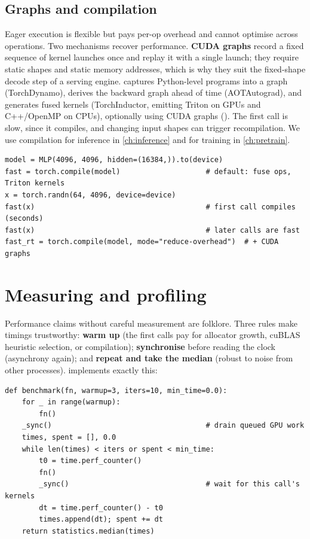 \subsection{Graphs and compilation}
Eager execution is flexible but pays per-op overhead and cannot optimise across operations. Two mechanisms
recover performance. \textbf{CUDA graphs} record a fixed sequence of kernel launches once and replay it with a
single launch; they require static shapes and static memory addresses, which is why they suit the
fixed-shape decode step of a serving engine. \textbf{} captures Python-level programs into a
graph (TorchDynamo), derives the backward graph ahead of time (AOTAutograd), and generates fused kernels
(TorchInductor, emitting Triton on GPUs and C++/OpenMP on CPUs), optionally using CUDA graphs
(). The first call is slow, since it compiles, and changing input shapes can trigger
recompilation. We use compilation for inference in \cref{ch:inference} and for training in \cref{ch:pretrain}.

\begin{lstlisting}[caption={Compiling a module. Same semantics, fewer and larger kernels.},label={lst:pytorch:compile}]
model = MLP(4096, 4096, hidden=(16384,)).to(device)
fast = torch.compile(model)                    # default: fuse ops, Triton kernels
x = torch.randn(64, 4096, device=device)
fast(x)                                        # first call compiles (seconds)
fast(x)                                        # later calls are fast
fast_rt = torch.compile(model, mode="reduce-overhead")  # + CUDA graphs
\end{lstlisting}

\section{Measuring and profiling}\label{sec:pytorch:profiling}

Performance claims without careful measurement are folklore. Three rules make timings trustworthy:
\textbf{warm up} (the first calls pay for allocator growth, cuBLAS heuristic selection, or compilation);
\textbf{synchronise} before reading the clock (asynchrony again); and \textbf{repeat and take the median}
(robust to noise from other processes).  implements exactly this:

\begin{lstlisting}[caption={Honest timing (from \texttt{llmsys/profiling.py}).},label={lst:pytorch:bench}]
def benchmark(fn, warmup=3, iters=10, min_time=0.0):
    for _ in range(warmup):
        fn()
    _sync()                                    # drain queued GPU work
    times, spent = [], 0.0
    while len(times) < iters or spent < min_time:
        t0 = time.perf_counter()
        fn()
        _sync()                                # wait for this call's kernels
        dt = time.perf_counter() - t0
        times.append(dt); spent += dt
    return statistics.median(times)
\end{lstlisting}

